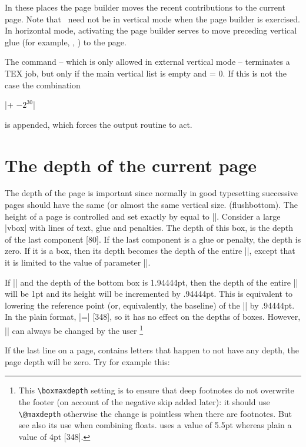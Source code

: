 In these places the page builder moves the recent contributions to the current page. Note that
\tex\  need not be in vertical mode when the page builder is exercised. In horizontal mode,
activating the page builder serves to move preceding vertical glue (for example, ,
) to the page.

The  command – which is only allowed in external vertical mode – terminates a TEX job,
but only if the main vertical list is empty and  = 0. If this is not the case the
combination


|\hbox{}\vfill\penalty+ $-2^{30}$|

is appended, which forces the output routine to act.

\section{The depth of the current page}
The depth of the page is important since normally in good typesetting successive pages should have the same (or almost the same vertical size. (flushbottom). The height of a page is controlled and set exactly by \tex equal to |\vsize|. Consider a large |vbox| with lines of text, glue and penalties. The depth of this box, is the depth of the last component [80]. If the last component is a glue or penalty, the depth is zero. If it is a box, then its depth becomes the depth of the entire |\vbox|, except that it is limited to the value of parameter |\boxmaxdepth|.

If
|\boxmaxdepth=1pt| and the depth of the bottom box
is 1.94444pt, then the depth of the entire |\vbox|
will be 1pt and its height will be incremented
by .94444pt. This is equivalent to lowering the
reference point (or, equivalently, the baseline) of
the |\vbox| by .94444pt. In the plain format,
|\boxmaxdepth=\maxdimen| [348], so it has no effect
on the depths of boxes. However, |\boxmaxdepth|
can always be changed by the user \footnote{This \texttt{\textbackslash boxmaxdepth} setting is to ensure that deep footnotes do not overwrite the
footer (on account of the negative skip added later): it should use \texttt{\textbackslash @maxdepth}
otherwise the change is pointless when there are footnotes.
But see also its use when combining 
floats.  \latex uses a value of 5.5pt whereas plain a value of 4pt [348].}

%


If the last line on a page, contains letters that happen to not have any depth, the page depth will be zero. Try for example this:

